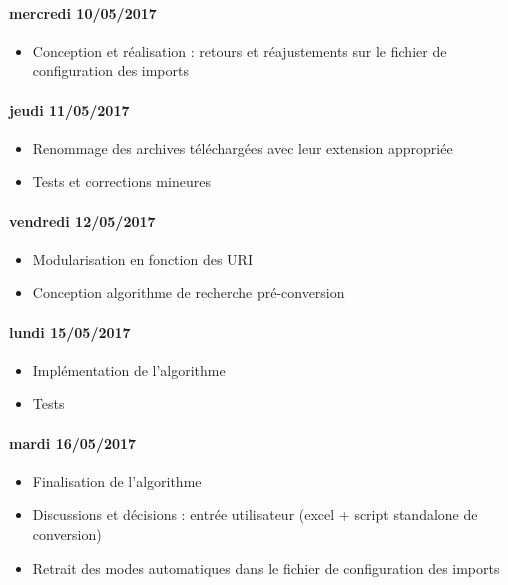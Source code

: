 \paragraph{mercredi 10/05/2017}
\begin{itemize}
  \item Conception et réalisation : retours et réajustements sur le fichier de configuration des imports
\end{itemize}

\paragraph{jeudi 11/05/2017}
\begin{itemize}
  \item Renommage des archives téléchargées avec leur extension appropriée
  \item Tests et corrections mineures
\end{itemize}

\paragraph{vendredi 12/05/2017}
\begin{itemize}
  \item Modularisation en fonction des URI
  \item Conception algorithme de recherche pré-conversion
\end{itemize}

\paragraph{lundi 15/05/2017}
\begin{itemize}
  \item Implémentation de l'algorithme
  \item Tests
\end{itemize}

\paragraph{mardi 16/05/2017}
\begin{itemize}
  \item Finalisation de l'algorithme
  \item Discussions et décisions : entrée utilisateur (excel + script standalone de conversion)
  \item Retrait des modes automatiques dans le fichier de configuration des imports
\end{itemize}

